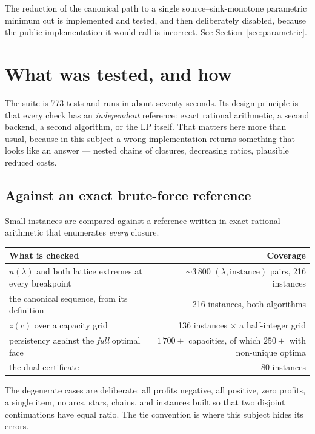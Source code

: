 \documentclass[11pt,a4paper]{article}
\begin{document}
The reduction of the canonical path to a single source--sink-monotone
parametric minimum cut is implemented and tested, and then deliberately
disabled, because the public implementation it would call is incorrect. See
Section~\ref{sec:parametric}.

\section{What was tested, and how}
\label{sec:tested}

The suite is 773 tests and runs in about seventy seconds. Its design principle
is that every check has an \emph{independent} reference: exact rational
arithmetic, a second backend, a second algorithm, or the LP itself. That
matters here more than usual, because in this subject a wrong implementation
returns something that looks like an answer --- nested chains of closures,
decreasing ratios, plausible reduced costs.

\subsection{Against an exact brute-force reference}

Small instances are compared against a reference written in exact rational
arithmetic that enumerates \emph{every} closure.

\begin{center}
\begin{tabular}{@{}p{}r@{}}
\toprule
\textbf{What is checked} & \textbf{Coverage}\\
\midrule
$u(\lambda)$ and both lattice extremes at every breakpoint & $\sim3\,800$
$(\lambda,\text{instance})$ pairs, 216 instances\\
the canonical sequence, from its definition & 216 instances, both algorithms\\
$z(c)$ over a capacity grid & 136 instances $\times$ a half-integer grid\\
persistency against the \emph{full} optimal face & $1\,700+$ capacities, of
which $250+$ with non-unique optima\\
the dual certificate & 80 instances\\
\bottomrule
\end{tabular}
\end{center}

The degenerate cases are deliberate: all profits negative, all positive, zero
profits, a single item, no arcs, stars, chains, and instances built so that
two disjoint continuations have equal ratio. The tie convention is where this
subject hides its errors.
\end{document}
